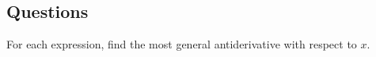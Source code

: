 \subsection*{Questions}
\begin{questions}
  \questioA For each expression, find the most general antiderivative with respect to $ x $.
    \begin{multicols}{2}
\end{multicols}
\end{questions}
